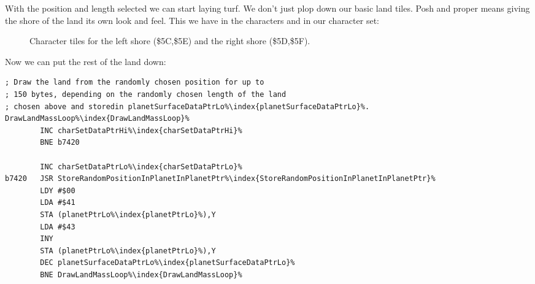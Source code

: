 With the position and length selected we can start laying turf. We don't just plop down our basic land tiles. Posh
and proper means giving the shore of the land its own look and feel. This we have in the characters  and
 in our character set: 

\begin{figure}[H]
{
  \setlength{\tabcolsep}{3.0pt}
  \setlength\cmidrulewidth{\heavyrulewidth} %
    \begin{adjustbox}{width=15cm,center}
  \begin{subfigure}{0.3\textwidth}
  
  \end{subfigure}
  \begin{subfigure}{0.3\textwidth}
  
  \end{subfigure}
  \begin{subfigure}{0.3\textwidth}
  
  \end{subfigure}
  \begin{subfigure}{0.3\textwidth}
  
  \end{subfigure}
  \end{adjustbox}
}\caption[]{Character tiles for the left shore (\$5C,\$5E) and the right shore (\$5D,\$5F).}
\end{figure}

Now we can put the rest of the land down:

\begin{lstlisting}[caption=Write pairs of \icode{\$41,\$43} for the main land mass.,escapechar=\%]
; Draw the land from the randomly chosen position for up to
; 150 bytes, depending on the randomly chosen length of the land
; chosen above and storedin planetSurfaceDataPtrLo%\index{planetSurfaceDataPtrLo}%.
DrawLandMassLoop%\index{DrawLandMassLoop}%   
        INC charSetDataPtrHi%\index{charSetDataPtrHi}%
        BNE b7420

        INC charSetDataPtrLo%\index{charSetDataPtrLo}%
b7420   JSR StoreRandomPositionInPlanetInPlanetPtr%\index{StoreRandomPositionInPlanetInPlanetPtr}%
        LDY #$00
        LDA #$41
        STA (planetPtrLo%\index{planetPtrLo}%),Y
        LDA #$43
        INY
        STA (planetPtrLo%\index{planetPtrLo}%),Y
        DEC planetSurfaceDataPtrLo%\index{planetSurfaceDataPtrLo}%
        BNE DrawLandMassLoop%\index{DrawLandMassLoop}%
\end{lstlisting}

